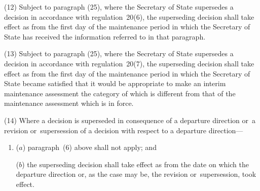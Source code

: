 \documentclass[a4paper,12pt]{article}
\begin{document}
(12) 
Subject to paragraph (25),  %
where the Secretary of State supersedes a decision in accordance with regulation~20(6), the superseding decision shall take effect as from the first day of the maintenance period in which the Secretary of State has received the information referred to in that paragraph.

(13) 
Subject to paragraph (25),  %
where the Secretary of State supersedes a decision in accordance with regulation~20(7), the superseding decision shall take effect as from the first day of the maintenance period in which the Secretary of State became satisfied that it would be appropriate to make an interim maintenance assessment the category of which is different from that of the maintenance assessment which is in force.

(14) Where a decision is superseded in consequence of a departure direction or~a revision or~supersession of a decision with respect to a departure direction---
\begin{enumerate}\item[]
($a$) paragraph~(6) above shall not apply; and

($b$) the superseding decision shall take effect as from the date on which the departure direction or, as the case may be, the revision or~supersession, took effect.
\end{enumerate}
\end{document}
